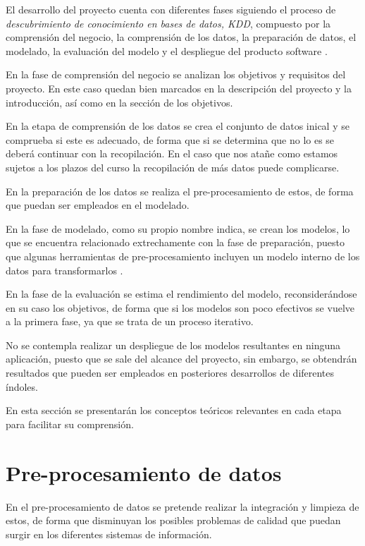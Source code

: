 El desarrollo del proyecto cuenta con diferentes fases siguiendo el proceso de \textit{descubrimiento de conocimiento
en bases de datos, KDD}, compuesto por la comprensión del negocio, la comprensión de los datos, la preparación de datos,
el modelado, la evaluación del modelo y el despliegue del producto software \cite{book:witten2017}.


En la fase de comprensión del negocio se analizan los objetivos y requisitos del proyecto. 
En este caso quedan bien marcados en la descripción del proyecto y la introducción, así como en la sección de los objetivos.

En la etapa de comprensión de los datos se crea el conjunto de datos inical y se comprueba si este es adecuado,
de forma que si se determina que no lo es se deberá continuar con la recopilación.
En el caso que nos atañe como estamos sujetos a los plazos del curso la recopilación de más datos puede complicarse.

En la preparación de los datos se realiza el pre-procesamiento de estos, de forma que puedan ser empleados en el modelado.

En la fase de modelado, como su propio nombre indica, se crean los modelos, lo que se encuentra relacionado extrechamente con
la fase de preparación, puesto que algunas herramientas de pre-procesamiento incluyen un modelo interno 
de los datos para transformarlos \cite{book:witten2017}.

En la fase de la evaluación se estima el rendimiento del modelo, reconsiderándose en su caso los objetivos, de forma 
que si los modelos son poco efectivos se vuelve a la primera fase, ya que se trata de
un proceso iterativo.

No se contempla realizar un despliegue de los modelos resultantes en ninguna aplicación, puesto que se sale del alcance del proyecto,
sin embargo, se obtendrán resultados que pueden ser empleados en posteriores desarrollos de diferentes
índoles.

En esta sección se presentarán los conceptos teóricos relevantes en cada etapa para facilitar su comprensión.

\section{Pre-procesamiento de datos}
En el pre-procesamiento de datos se pretende realizar la integración y limpieza de estos, de forma que disminuyan los posibles problemas
de calidad que puedan surgir en los diferentes sistemas de información.

